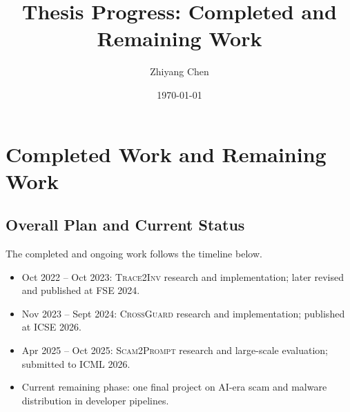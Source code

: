 \documentclass[11pt]{article}
\title{Thesis Progress: Completed and Remaining Work}
\author{Zhiyang Chen}
\date{\today}
\begin{document}
\maketitle

\section{Completed Work and Remaining Work}



\subsection{Overall Plan and Current Status}

The completed and ongoing work follows the timeline below.
\begin{itemize}
	\item Oct 2022 -- Oct 2023: \textsc{Trace2Inv} research and implementation;
	later revised and published at FSE 2024.
	\item Nov 2023 -- Sept 2024: \textsc{CrossGuard} research and implementation;
	published at ICSE 2026.
	\item Apr 2025 -- Oct 2025: \textsc{Scam2Prompt} research and large-scale evaluation;
	submitted to ICML 2026.
	\item Current remaining phase: one final project on AI-era scam and malware 
	distribution in developer pipelines.
\end{itemize}
\end{document}
